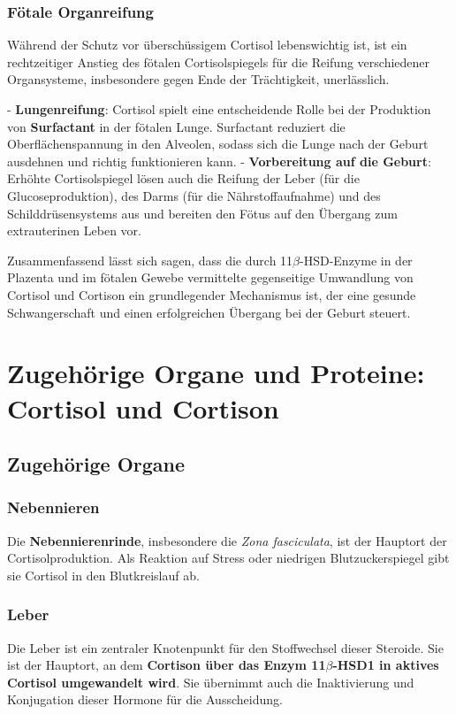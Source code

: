 \documentclass{article}
\begin{document}
\subsubsection{Fötale Organreifung}

Während der Schutz vor überschüssigem Cortisol lebenswichtig ist, ist ein rechtzeitiger Anstieg des fötalen Cortisolspiegels für die Reifung verschiedener Organsysteme, insbesondere gegen Ende der Trächtigkeit, unerlässlich.

- \textbf{Lungenreifung}: Cortisol spielt eine entscheidende Rolle bei der Produktion von \textbf{Surfactant} in der fötalen Lunge. Surfactant reduziert die Oberflächenspannung in den Alveolen, sodass sich die Lunge nach der Geburt ausdehnen und richtig funktionieren kann.
- \textbf{Vorbereitung auf die Geburt}: Erhöhte Cortisolspiegel lösen auch die Reifung der Leber (für die Glucoseproduktion), des Darms (für die Nährstoffaufnahme) und des Schilddrüsensystems aus und bereiten den Fötus auf den Übergang zum extrauterinen Leben vor.

Zusammenfassend lässt sich sagen, dass die durch 11\texorpdfstring{$\beta$}{beta}-HSD-Enzyme in der Plazenta und im fötalen Gewebe vermittelte gegenseitige Umwandlung von Cortisol und Cortison ein grundlegender Mechanismus ist, der eine gesunde Schwangerschaft und einen erfolgreichen Übergang bei der Geburt steuert.


\section{Zugehörige Organe und Proteine: Cortisol und Cortison}

\subsection{Zugehörige Organe}

\subsubsection{Nebennieren}
Die \textbf{Nebennierenrinde}, insbesondere die \textit{Zona fasciculata}, ist der Hauptort der Cortisolproduktion. Als Reaktion auf Stress oder niedrigen Blutzuckerspiegel gibt sie Cortisol in den Blutkreislauf ab.

\subsubsection{Leber}
Die Leber ist ein zentraler Knotenpunkt für den Stoffwechsel dieser Steroide. Sie ist der Hauptort, an dem \textbf{Cortison über das Enzym 11\texorpdfstring{$\beta$}{beta}-HSD1 in aktives Cortisol umgewandelt wird}. Sie übernimmt auch die Inaktivierung und Konjugation dieser Hormone für die Ausscheidung.
\end{document}

